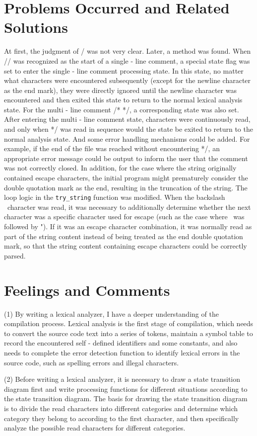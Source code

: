 \documentclass[a4paper,12pt]{article}
\begin{document}
\section{Problems Occurred and Related Solutions}
At first, the judgment of / was not very clear. Later, a method was found. When // was recognized as the start of a single - line comment, a special state flag was set to enter the single - line comment processing state. In this state, no matter what characters were encountered subsequently (except for the newline character as the end mark), they were directly ignored until the newline character was encountered and then exited this state to return to the normal lexical analysis state. For the multi - line comment /* */, a corresponding state was also set. After entering the multi - line comment state, characters were continuously read, and only when */ was read in sequence would the state be exited to return to the normal analysis state. And some error handling mechanisms could be added. For example, if the end of the file was reached without encountering */, an appropriate error message could be output to inform the user that the comment was not correctly closed. In addition, for the case where the string originally contained escape characters, the initial program might prematurely consider the double quotation mark as the end, resulting in the truncation of the string. The loop logic in the \texttt{try\_string} function was modified. When the backslash \ character was read, it was necessary to additionally determine whether the next character was a specific character used for escape (such as the case where \ was followed by "). If it was an escape character combination, it was normally read as part of the string content instead of being treated as the end double quotation mark, so that the string content containing escape characters could be correctly parsed.

\section{Feelings and Comments}
(1) By writing a lexical analyzer, I have a deeper understanding of the compilation process. Lexical analysis is the first stage of compilation, which needs to convert the source code text into a series of tokens, maintain a symbol table to record the encountered self - defined identifiers and some constants, and also needs to complete the error detection function to identify lexical errors in the source code, such as spelling errors and illegal characters.

(2) Before writing a lexical analyzer, it is necessary to draw a state transition diagram first and write processing functions for different situations according to the state transition diagram. The basis for drawing the state transition diagram is to divide the read characters into different categories and determine which category they belong to according to the first character, and then specifically analyze the possible read characters for different categories.
    
\end{document}
